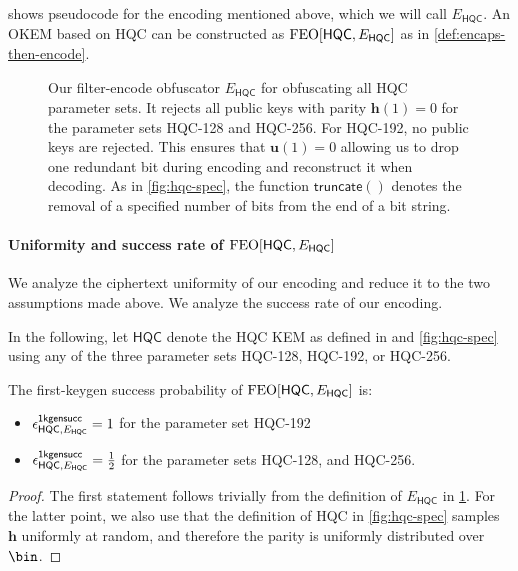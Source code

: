  shows pseudocode for the encoding mentioned above, which we will call $E_\mathsf{HQC}$. An OKEM based on HQC can be constructed as $\textsf{\textnormal{FEO}}[\mathsf{HQC}, E_\mathsf{HQC}]$ as in \cref{def:encaps-then-encode}.

\begin{figure}
    
    \caption[
        Our filter-encode obfuscator $E_\mathsf{HQC}$ for obfuscating all HQC parameter sets.
    ]{
        Our filter-encode obfuscator $E_\mathsf{HQC}$ for obfuscating all HQC parameter sets. It rejects all public keys with parity $\mathbf h(1)=0$ for the parameter sets HQC-128 and HQC-256. For HQC-192, no public keys are rejected. This ensures that $\mathbf u(1)=0$ allowing us to drop one redundant bit during encoding and reconstruct it when decoding. As in \cref{fig:hqc-spec}, the function $\mathsf{truncate}()$ denotes the removal of a specified number of bits from the end of a bit string.
    }
    \label{fig:hqc-encoding}
\end{figure}

\paragraph{Uniformity and success rate of $\textsf{\textnormal{FEO}}[\mathsf{HQC}, E_\mathsf{HQC}]$}

We analyze the ciphertext uniformity of our encoding and reduce it to the two assumptions made above. We analyze the success rate of our encoding.

In the following, let $\mathsf{HQC}$ denote the HQC KEM as defined in \cite{NISTPQC-R4:HQC22} and \cref{fig:hqc-spec} using any of the three parameter sets HQC-128, HQC-192, or HQC-256.

\begin{lemma}
\label{lem:hqc-first-keygen-success}
    The first-keygen success probability of $\textsf{\textnormal{FEO}}[\mathsf{HQC}, E_\mathsf{HQC}]$ is:
    \begin{itemize}
        \item $\epsilon^{\mathsf{1kgensucc}}_{\mathsf{HQC}, E_\mathsf{HQC}} = 1$ for the parameter set HQC-192
        \item $\epsilon^{\mathsf{1kgensucc}}_{\mathsf{HQC}, E_\mathsf{HQC}} = \frac12$ for the parameter sets HQC-128, and HQC-256.
    \end{itemize}
\end{lemma}
\begin{proof}
    The first statement follows trivially from the definition of $E_\mathsf{HQC}$ in \cref{fig:hqc-encoding}.
    For the latter point, we also use that the definition of HQC in \cref{fig:hqc-spec} samples $\mathbf h$ uniformly at random, and therefore the parity is uniformly distributed over $\bin$.
\end{proof}

